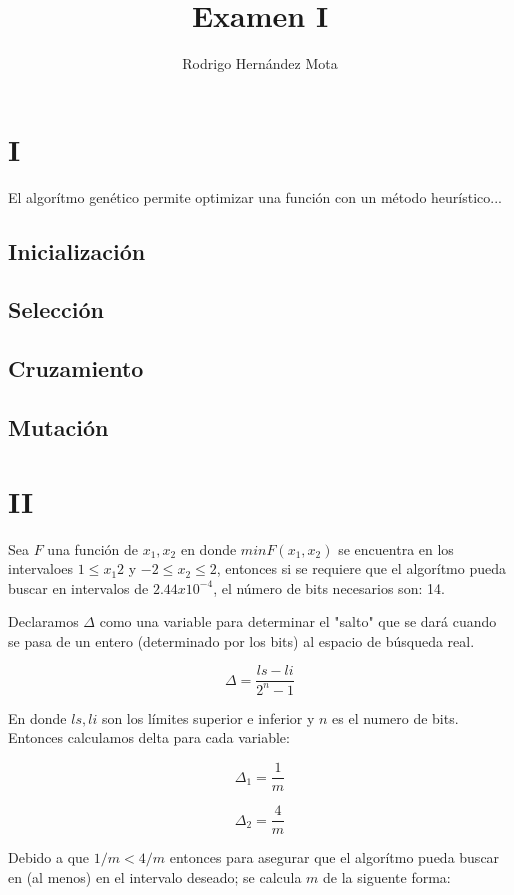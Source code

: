 \documentclass[11p]{report}
\begin{document}
\title{Examen I}
\author{Rodrigo Hern\'andez Mota}

\maketitle

\section{I}
El algor\'itmo gen\'etico permite optimizar una funci\'on con un m\'etodo heur\'istico...
\subsection{Inicializaci\'on}
\subsection{Selecci\'on}
\subsection{Cruzamiento}
\subsection{Mutaci\'on}


\section{II}
Sea $F$ una funci\'on de $x_1, x_2$ en donde $min F(x_1, x_2)$ se encuentra en los intervaloes $1 \leq x_1 2$ y $-2 \leq x_2 \leq 2$, entonces si se requiere que el algor\'itmo pueda buscar en intervalos de $2.44x10^{-4}$, el n\'umero de bits necesarios son: 14.

Declaramos $\Delta$ como una variable para determinar el "salto" que se dar\'a cuando se pasa de un entero (determinado por los bits) al espacio de b\'usqueda real. 

$$
\Delta = \frac{ls - li}{2^n - 1}
$$

En donde $ls, li$ son los l\'imites superior e inferior y $n$ es el numero de bits. 
Entonces calculamos delta para cada variable:

$$
\Delta_1 = \frac{1}{m}
$$

$$
\Delta_2 = \frac{4}{m}
$$

Debido a que $1/m < 4/m$ entonces para asegurar que el algor\'itmo pueda buscar en (al menos) en el intervalo deseado; se calcula $m$ de la siguente forma:
\end{document}
